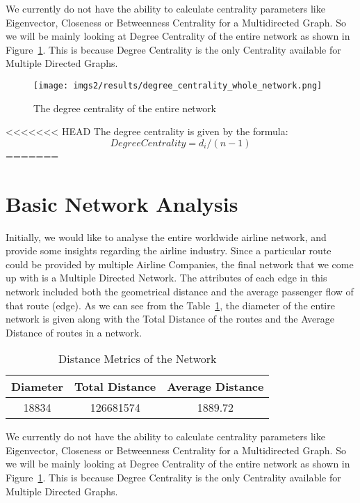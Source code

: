 \documentclass[twocolumn]{tum-article}
\begin{document}
We currently do not have the ability to calculate centrality parameters like Eigenvector, Closeness or Betweenness Centrality for a Multidirected Graph. So we will be mainly looking at Degree Centrality of the entire network as shown in Figure~\ref{fig:degree_centrality}.
This is because Degree Centrality is the only Centrality available for Multiple Directed Graphs.

\begin{figure}
        \centering
        \texttt{[image: imgs2/results/degree\_centrality\_whole\_network.png]}
        \caption{
The degree centrality of the entire network}
        \label{fig:degree_centrality}
\end{figure}

<<<<<<< HEAD
The degree centrality is given by the formula:
\begin{equation}
	Degree Centrality=d_i/(n-1)
\end{equation}
=======\section{Basic Network Analysis}
Initially, we would like to analyse the entire worldwide airline network, and provide some insights regarding the airline industry.
Since a particular route could be provided by multiple Airline Companies, the final network that we come up with is a Multiple Directed Network.
The attributes of each edge in this network included both the geometrical distance and the average passenger flow of that route (edge). 
As we can see from the Table~\ref{Tab:distance_metrics}, the diameter of the entire network is given along with the Total Distance of the routes and the Average Distance of routes in a network.  

\begin{center}
\begin{table}[ht]	
 \begin{tabular}{| c | c | c |}
 \hline
 Diameter & Total Distance & Average Distance \\ [0.5ex]
 \hline
 18834 & 126681574 & 1889.72 \\
 \hline
 \end{tabular}
\caption{Distance Metrics of the Network}
\label{Tab:distance_metrics}	 
\end{table}
\end{center}

We currently do not have the ability to calculate centrality parameters like Eigenvector, Closeness or Betweenness Centrality for a Multidirected Graph. So we will be mainly looking at Degree Centrality of the entire network as shown in Figure~\ref{fig:degree_centrality}.
This is because Degree Centrality is the only Centrality available for Multiple Directed Graphs.
\end{document}
